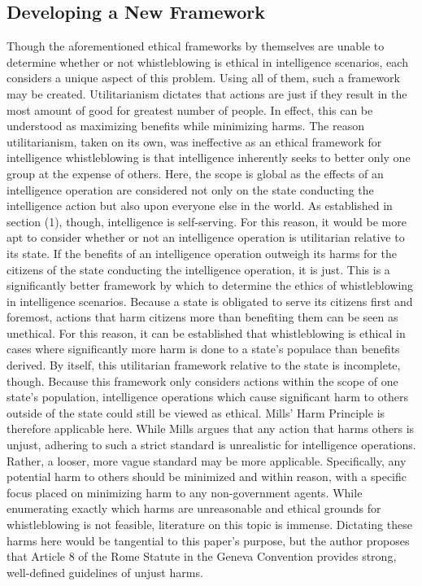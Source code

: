 \documentclass [12 pt] {article}
\begin{document}
\subsection{Developing a New Framework}
Though the aforementioned ethical frameworks by themselves are unable to determine whether or not whistleblowing is ethical in intelligence scenarios, each considers a unique aspect of this problem. Using all of them, such a framework may be created.
\bigbreak
Utilitarianism dictates that actions are just if they result in the most amount of good for greatest number of people. In effect, this can be understood as maximizing benefits while minimizing harms. The reason utilitarianism, taken on its own, was ineffective as an ethical framework for intelligence whistleblowing is that intelligence inherently seeks to better only one group at the expense of others. Here, the scope is global as the effects of an intelligence operation are considered not only on the state conducting the intelligence action but also upon everyone else in the world. As established in section (1), though, intelligence is self-serving. For this reason, it would be more apt to consider whether or not an intelligence operation is utilitarian relative to its state. If the benefits of an intelligence operation outweigh its harms for the citizens of the state conducting the intelligence operation, it is just. This is a significantly better framework by which to determine the ethics of whistleblowing in intelligence scenarios. Because a state is obligated to serve its citizens first and foremost, actions that harm citizens more than benefiting them can be seen as unethical. For this reason, it can be established that whistleblowing is ethical in cases where significantly more harm is done to a state's populace than benefits derived.
\bigbreak
By itself, this utilitarian framework relative to the state is incomplete, though. Because this framework only considers actions within the scope of one state's population, intelligence operations which cause significant harm to others outside of the state could still be viewed as ethical. Mills' Harm Principle is therefore applicable here. While Mills argues that any action that harms others is unjust, adhering to such a strict standard is unrealistic for intelligence operations. Rather, a looser, more vague standard may be more applicable. Specifically, any potential harm to others should be minimized and within reason, with a specific focus placed on minimizing harm to any non-government agents. While enumerating exactly which harms are unreasonable and ethical grounds for whistleblowing is not feasible, literature on this topic is immense. Dictating these harms here would be tangential to this paper's purpose, but the author proposes that Article 8 of the Rome Statute in the Geneva Convention provides strong, well-defined guidelines of unjust harms.
\end{document}

